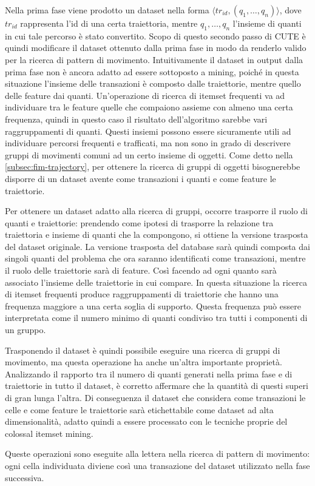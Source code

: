 Nella prima fase viene prodotto un dataset nella forma \(\langle tr_{id}, (q_1,\ldots,q_n) \rangle\),
dove \(tr_{id}\) rappresenta l'id di una certa traiettoria, mentre \(q_1,\ldots,q_n\)
l'insieme di quanti in cui tale percorso è stato convertito.
Scopo di questo secondo passo di CUTE è quindi modificare il dataset ottenuto dalla prima fase in modo da renderlo valido per la ricerca di pattern di movimento.
Intuitivamente il dataset in output dalla prima fase non è ancora adatto ad essere sottoposto a mining, poiché in questa situazione l'insieme delle transazioni è composto dalle traiettorie,
mentre quello delle feature dai quanti.
Un'operazione di ricerca di itemset frequenti va ad individuare tra le feature quelle che compaiono assieme con almeno una certa frequenza,
quindi in questo caso il risultato dell'algoritmo sarebbe vari raggruppamenti di quanti.
Questi insiemi possono essere sicuramente utili ad individuare percorsi frequenti e trafficati, ma non sono in grado di descrivere gruppi di movimenti comuni ad un certo insieme di oggetti.
Come detto nella \cref{subsec:fim-trajectory}, per ottenere la ricerca di gruppi di oggetti bisognerebbe disporre di un dataset avente come transazioni i quanti e come feature le traiettorie.

Per ottenere un dataset adatto alla ricerca di gruppi, occorre trasporre il ruolo di quanti e traiettorie: prendendo come
ipotesi di trasporre la relazione tra traiettoria e insieme di quanti che la compongono, si ottiene la versione trasposta del dataset originale.
La versione trasposta del database sarà quindi composta dai singoli quanti del problema che ora saranno identificati come transazioni, mentre il ruolo delle traiettorie sarà di feature. 
Così facendo ad ogni quanto sarà associato l'insieme delle traiettorie in cui compare.
In questa situazione la ricerca di itemset frequenti produce raggruppamenti di traiettorie che hanno una frequenza maggiore a una certa soglia di supporto.
Questa frequenza può essere interpretata come il numero minimo di quanti condiviso tra tutti i componenti di un gruppo.

Trasponendo il dataset è quindi possibile eseguire una ricerca di gruppi di movimento, ma questa operazione ha anche un'altra importante proprietà.
Analizzando il rapporto tra il numero di quanti generati nella prima fase e di traiettorie in tutto il dataset, è corretto affermare che
la quantità di questi superi di gran lunga l'altra.
Di conseguenza il dataset che considera come transazioni le celle e come feature le traiettorie sarà etichettabile come dataset ad alta dimensionalità, adatto quindi a essere processato con le tecniche proprie del colossal itemset mining.

Queste operazioni sono eseguite alla lettera nella ricerca di pattern di movimento: ogni cella individuata diviene così una transazione del dataset utilizzato nella fase successiva.
